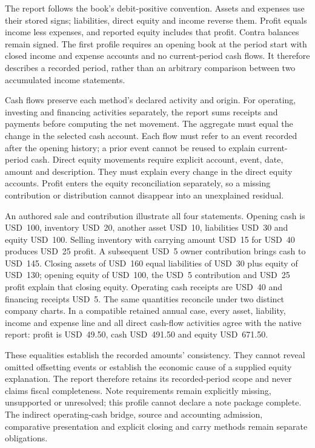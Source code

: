 The report follows the book's debit-positive convention. Assets and expenses use
their stored signs; liabilities, direct equity and income reverse them. Profit
equals income less expenses, and reported equity includes that profit. Contra
balances remain signed. The first profile requires an opening book at the period
start with closed income and expense accounts and no current-period cash flows.
It therefore describes a recorded period, rather than an arbitrary comparison
between two accumulated income statements.

Cash flows preserve each method's declared activity and origin. For operating,
investing and financing activities separately, the report sums receipts and
payments before computing the net movement. The aggregate must equal the change
in the selected cash account. Each flow must refer to an event recorded after
the opening history; a prior event cannot be reused to explain current-period
cash. Direct equity movements require explicit account, event, date, amount and
description. They must explain every change in the direct equity accounts.
Profit enters the equity reconciliation separately, so a missing contribution
or distribution cannot disappear into an unexplained residual.

An authored sale and contribution illustrate all four statements. Opening cash
is USD~100, inventory USD~20, another asset USD~10, liabilities USD~30 and equity
USD~100. Selling inventory with carrying amount USD~15 for USD~40 produces
USD~25 profit. A subsequent USD~5 owner contribution brings cash to USD~145.
Closing assets of USD~160 equal liabilities of USD~30 plus equity of USD~130;
opening equity of USD~100, the USD~5 contribution and USD~25 profit explain that
closing equity. Operating cash receipts are USD~40 and financing receipts USD~5.
The same quantities reconcile under two distinct company charts. In a compatible
retained annual case, every asset, liability, income and expense line and all
direct cash-flow activities agree with the native report: profit is USD~49.50,
cash USD~491.50 and equity USD~671.50.

These equalities establish the recorded amounts' consistency. They cannot reveal
omitted offsetting events or establish the economic cause of a supplied equity
explanation. The report therefore retains its recorded-period scope and never
claims fiscal completeness. Note requirements remain explicitly missing,
unsupported or unresolved; this profile cannot declare a note package complete.
The indirect operating-cash bridge, source and accounting admission, comparative
presentation and explicit closing and carry methods remain separate obligations.

